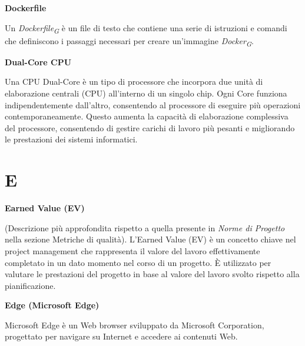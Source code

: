 \documentclass{article}
\begin{document}
\vspace{0.4cm}

\textbf{Dockerfile}

\vspace{0.1cm}

Un \textit{Dockerfile}\textsubscript{\textit{G}} è un file di testo che contiene una serie di istruzioni e comandi che definiscono i passaggi necessari per creare un'immagine \textit{Docker}\textsubscript{\textit{G}}.

\vspace{0.4cm}

\textbf{Dual-Core CPU}

\vspace{0.1cm}

Una CPU Dual-Core è un tipo di processore che incorpora due unità di elaborazione centrali (CPU) all'interno di un singolo chip. Ogni Core funziona indipendentemente dall'altro, consentendo al processore di eseguire più operazioni contemporaneamente. Questo aumenta la capacità di elaborazione complessiva del processore, consentendo di gestire carichi di lavoro più pesanti e migliorando le prestazioni dei sistemi informatici.

\pagebreak
\section*{E}
{}

\vspace{0.4cm}

\textbf{Earned Value (EV)}

\vspace{0.1cm}

(Descrizione più approfondita rispetto a quella presente in \textit{Norme di Progetto} nella sezione Metriche di qualità). L'Earned Value (EV) è un concetto chiave nel project management che rappresenta il valore del lavoro effettivamente completato in un dato momento nel corso di un progetto. È utilizzato per valutare le prestazioni del progetto in base al valore del lavoro svolto rispetto alla pianificazione.

\vspace{0.4cm}

\textbf{Edge (Microsoft Edge)}

\vspace{0.1cm}

Microsoft Edge è un Web browser sviluppato da Microsoft Corporation, progettato per navigare su Internet e accedere ai contenuti Web.
\end{document}
